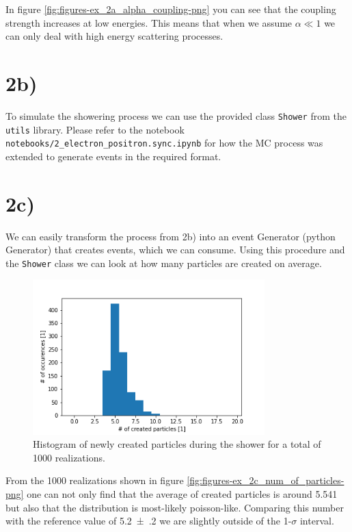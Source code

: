 \documentclass[12pt,a4paper]{scrartcl}
\begin{document}
In figure \eqref{fig:figures-ex_2a_alpha_coupling-png} you can see that the coupling strength increases at low energies.
This means that when we assume $\alpha \ll 1$ we can only deal with high energy scattering processes.

\section*{2b)}
To simulate the showering process we can use the provided class \lstinline{Shower} from the \lstinline{utils} library.
Please refer to the notebook \lstinline{notebooks/2_electron_positron.sync.ipynb} for how the MC process was extended to generate events in the required format.


\section*{2c)}
We can easily transform the process from 2b) into an event Generator (python Generator) that creates events, which we can consume.
Using this procedure and the \lstinline{Shower} class we can look at how many particles are created on average.

\begin{figure}[htpb]
    \centering
    \includegraphics[width=0.8\textwidth]{figures/ex_2c_num_of_particles.png}
    \caption{Histogram of newly created particles during the shower for a total of 1000 realizations.}
    \label{fig:figures-ex_2c_num_of_particles-png}
\end{figure}

From the 1000 realizations shown in figure \eqref{fig:figures-ex_2c_num_of_particles-png} one can not only find that the average of created particles is around \num{5.541} but also that the distribution is most-likely poisson-like.
Comparing this number with the reference value of \SI{5.2(2)}{} we are slightly outside of the 1-$\sigma$ interval.
\end{document}

